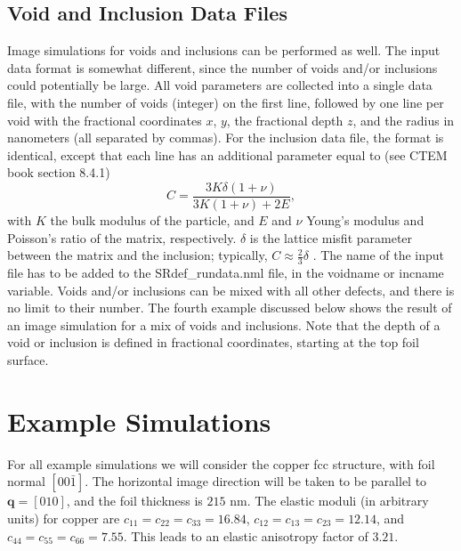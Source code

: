 \documentclass[11pt]{article}
\begin{document}
\subsection{Void and Inclusion Data Files}
Image simulations for voids and inclusions can be performed as well.  The input data format is somewhat different, since the 
number of voids and/or inclusions could potentially be large.  All void parameters are collected into a single data file, with the 
number of voids (integer) on the first line, followed by one line per void with the fractional coordinates $x$, $y$, the fractional 
depth $z$, and the radius in nanometers (all separated by commas).  For the inclusion data file, the format is identical,
except that each line has an additional parameter equal to (see CTEM book section 8.4.1)
\begin{equation}
    C = \frac{3K\delta(1+\nu)}{3K(1+\nu)+2E},
\end{equation}
with $K$ the bulk modulus of the particle, and $E$ and $\nu$ Young's
modulus and Poisson's ratio of the matrix, respectively.  $\delta$ is the lattice
misfit parameter between the matrix and the inclusion; typically, $C\approx\frac{2}{3}\delta$ .
The name of the input file has to be added to the \textsf{SRdef\_rundata.nml} file, in the \textsf{voidname}
or \textsf{incname} variable.
Voids and/or inclusions can be mixed with all other defects, and there is no limit to their number.  The fourth example
discussed below shows the result of an image simulation for a mix of voids and inclusions.  Note that the depth of a void or 
inclusion is defined in fractional coordinates, starting at the top foil surface.


\section{Example Simulations}

For all example simulations we will consider the copper fcc structure, with foil normal $[00\bar{1}]$.  The 
horizontal image direction will be taken to be parallel to $\mathbf{q}=[010]$, and the foil thickness is $215$ nm.  The elastic moduli (in arbitrary units)
for copper are $c_{11}=c_{22}=c_{33}=16.84$, $c_{12}=c_{13}=c_{23}=12.14$, and $c_{44}=c_{55}=c_{66}=7.55$.  This leads to an elastic
anisotropy factor of $3.21$.  
\end{document}
